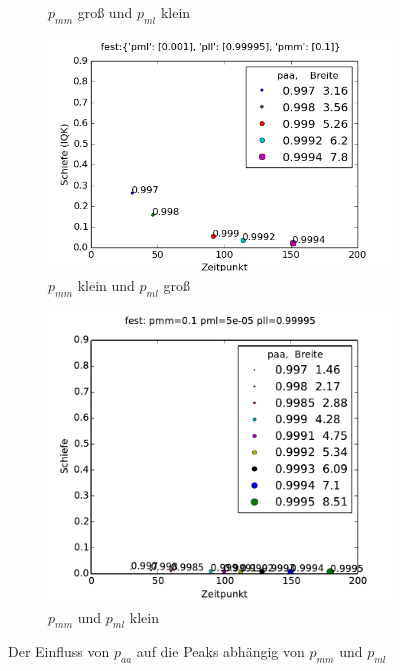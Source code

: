 \begin{figure}[H]
\begin{subfigure}[t]{0.5\textwidth}
\caption{$p_{mm}$ groß und $p_{ml}$ klein}
\end{subfigure}
\vspace*{7mm}
\begin{subfigure}[b]{0.5\textwidth}
\includegraphics[width=\textwidth]{bilder/paa/3fest_01_0001_p_099995}
\caption{$p_{mm}$ klein und $p_{ml}$ groß}
\end{subfigure}
\begin{subfigure}[b]{0.5\textwidth}
\includegraphics[width=\textwidth]{bilder/paa/3fest_01_5e-05_p_099995}
\caption{$p_{mm}$ und $p_{ml}$ klein}
\end{subfigure}
\caption{Der Einfluss von $p_{aa}$ auf die Peaks abhängig von $p_{mm}$ und $p_{ml}$}
\label{einfluss_paa}
\end{figure}

